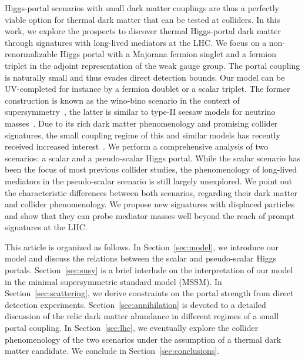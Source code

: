 \documentclass[nofootinbib,prd,aps,superscriptaddress,preprintnumbers]{revtex4}
\begin{document}
Higgs-portal scenarios with small dark matter couplings are thus a perfectly viable option for thermal dark matter that can be tested at colliders. In this work, we explore the prospects to discover thermal Higgs-portal dark matter through signatures with long-lived mediators at the LHC. We focus on a non-renormalizable Higgs portal with a Majorana fermion singlet and a fermion triplet in the adjoint representation of the weak gauge group. The portal coupling is naturally small and thus evades direct detection bounds. Our model can be UV-completed for instance by a fermion doublet or a scalar triplet. The former construction is known as the wino-bino scenario in the context of supersymmetry~\cite{ArkaniHamed:2006mb}, the latter is similar to type-II seesaw models for neutrino masses~\cite{Ma:2008cu,Choubey:2017yyn}. Due to its rich dark matter phenomenology and promising collider signatures, the small coupling regime of this and similar models has recently received increased interest~\cite{Lee:2018pag,Curtin:2018mvb,Rolbiecki:2015gsa,Nagata:2015pra,Bharucha:2018pfu,Calibbi:2018fqf}. We perform a comprehensive analysis of two scenarios: a scalar and a pseudo-scalar Higgs portal. While the scalar scenario has been the focus of most previous collider studies, the phenomenology of long-lived mediators in the pseudo-scalar scenario is still largely unexplored. We point out the characteristic differences between both scenarios, regarding their dark matter and collider phenomenology. We propose new signatures with displaced particles and show that they can probe mediator masses well beyond the reach of prompt signatures at the LHC.

This article is organized as follows. In Section~\ref{sec:model}, we introduce our model and discuss the relations between the scalar and pseudo-scalar Higgs portals. Section~\ref{sec:susy} is a brief interlude on the interpretation of our model in the minimal supersymmetric standard model (MSSM). In Section~\ref{sec:scattering}, we derive constraints on the portal strength from direct detection experiments. Section~\ref{sec:annihilation} is devoted to a detailed discussion of the relic dark matter abundance in different regimes of a small portal coupling. In Section~\ref{sec:lhc}, we eventually explore the collider phenomenology of the two scenarios under the assumption of a thermal dark matter candidate. We conclude in Section~\ref{sec:conclusions}.


\end{document}
